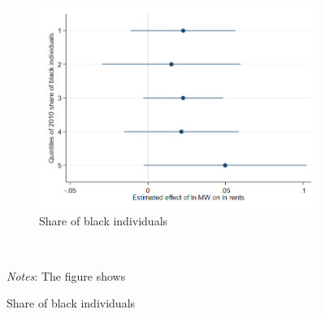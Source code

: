 \begin{figure}[htb]
\begin{subfigure}{0.5\textwidth}
    \end{subfigure}\\
    \begin{subfigure}{0.5\textwidth} \centering
        \includegraphics[width=0.99\linewidth]{analysis/first_differences/output/fd_static_heter_black_share2010.png}
        \caption{Share of black individuals} \label{appfig:fd_heterogeneity_work_county}
    \end{subfigure}\\
    \begin{minipage}{.95\textwidth} \footnotesize
		\vspace{2mm} 
		\textit{Notes}: The figure shows 
	\end{minipage}
\end{figure}
